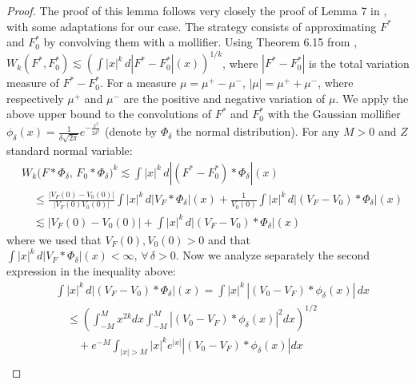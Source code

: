 \begin{proof}
    The proof of this lemma follows very closely the proof of Lemma 7 in \cite{25}, with some adaptations for our case. The strategy consists of approximating $F^*$ and $F^*_0$ by convolving them with a mollifier. Using Theorem 6.15 from \cite{31}, $W_k\left(F^*, F^*_0 \right) \lesssim \left( \int |x|^k \, d |F^* - F^*_0| (x)\right)^{1/k}$, where $|F^* - F^*_0|$ is the total variation measure of $F^* - F^*_0$. For a measure $\mu = \mu^+ - \mu^-$, $|\mu|=\mu^+ + \mu^-$, where respectively $\mu^+$ and $\mu^-$ are the positive and negative variation of $\mu$. We apply the above upper bound to the convolutions of $F^*$ and $F^*_0$ with the Gaussian mollifier $\phi_{\delta}(x)=\frac{1}{\delta \sqrt{2\pi}} e^{-\frac{x^2}{2 \delta^2}}$ (denote by $\Phi_{\delta}$ the normal distribution). For any $M>0$ and $Z$ standard normal variable:
    \begin{align*}
        &W_k\big(F * \Phi_\delta,\,  F_0 * \Phi_\delta\big)^k \lesssim \int|x|^k \,  d \left|\left(F^*-F^*_0\right) * \Phi_\delta  \right| (x) \\
        &\quad \leq \frac{|V_{\scriptscriptstyle{F}}(0) - V_0(0)|}{|V_{\scriptscriptstyle{F}}(0) V_0(0)|} \int |x|^k \, d|V_{\scriptscriptstyle{F}} * \Phi_{\delta}| (x) + \frac{1}{V_0(0)} \int |x|^k \, d \left|\left(V_{\scriptscriptstyle{F}}-V_0\right) * \Phi_\delta  \right| (x)\\
        &\quad \lesssim |V_{\scriptscriptstyle{F}}(0) - V_0(0)| + \int |x|^k \, d \left|\left(V_{\scriptscriptstyle{F}}-V_0\right) * \Phi_\delta  \right| (x)
    \end{align*}
    where we used that $V_{\scriptscriptstyle{F}}(0), V_0(0) >0$ and that $\int |x|^k \, d|V_{\scriptscriptstyle{F}} * \Phi_{\delta}| (x) < \infty, \, \forall \, \delta >0$. Now we analyze separately the second expression in the inequality above:
    \begin{align*}
        & \int |x|^k \, d \left|\left(V_{\scriptscriptstyle{F}}-V_0\right) * \Phi_\delta  \right| (x) =\int |x|^{k} \, \left| \left( V_0  - V_{\scriptscriptstyle{F}}  \right)  * \phi_\delta (x)  \right| \, dx\\
        &\quad \leq\left(\int_{-M}^M x^{2 k} d x \int_{-M}^M \left| \left( V_0  - V_{\scriptscriptstyle{F}}  \right)  * \phi_\delta (x)  \right|^2 d x\right)^{1 / 2} \\
        &\quad \quad+e^{-M} \int_{|x|>M}|x|^k e^{|x|} \left| \left( V_0  - V_{\scriptscriptstyle{F}}  \right)  * \phi_\delta (x)  \right| d x \\

\end{align*}
\end{proof}

